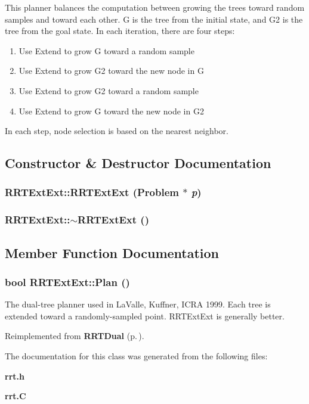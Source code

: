 This planner balances the computation between growing the trees toward random samples and toward each other. G is the tree from the initial state, and G2 is the tree from the goal state. In each iteration, there are four steps: \begin{enumerate}
 \item 
Use Extend to grow G toward a random sample \item 
Use Extend to grow G2 toward the new node in G \item 
Use Extend to grow G2 toward a random sample \item 
Use Extend to grow G toward the new node in G2 \end{enumerate}
 In each step, node selection is based on the nearest neighbor. 



\subsection{Constructor \& Destructor Documentation}
\subsubsection{\setlength{\rightskip}{0pt plus 5cm}RRTExt\-Ext::RRTExt\-Ext ({\bf Problem} $\ast$ {\em p})}\label{classRRTExtExt_a0}


\subsubsection{\setlength{\rightskip}{0pt plus 5cm}RRTExt\-Ext::$\sim$RRTExt\-Ext ()\hspace{0.3cm}{\tt  [inline, virtual]}}\label{classRRTExtExt_a1}




\subsection{Member Function Documentation}
\subsubsection{\setlength{\rightskip}{0pt plus 5cm}bool RRTExt\-Ext::Plan ()\hspace{0.3cm}{\tt  [virtual]}}\label{classRRTExtExt_a2}


The dual-tree planner used in La\-Valle, Kuffner, ICRA 1999. Each tree is extended toward a randomly-sampled point. RRTExt\-Ext is generally better.



Reimplemented from {\bf RRTDual} {\rm (p.\,\pageref{classRRTDual_a2})}.

The documentation for this class was generated from the following files:\begin{CompactItemize}
\item 
{\bf rrt.h}\item 
{\bf rrt.C}\end{CompactItemize}
